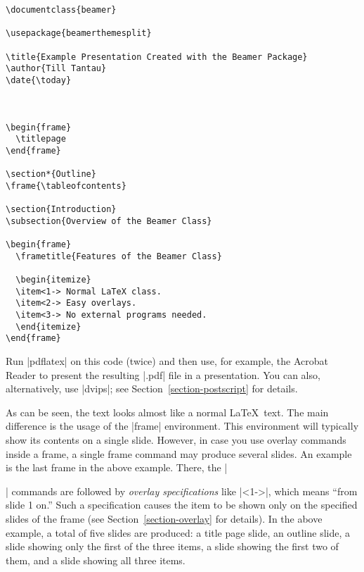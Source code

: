 \begin{verbatim}
\documentclass{beamer}

\usepackage{beamerthemesplit}

\title{Example Presentation Created with the Beamer Package}
\author{Till Tantau}
\date{\today}



\begin{frame}
  \titlepage
\end{frame}

\section*{Outline}
\frame{\tableofcontents}

\section{Introduction}
\subsection{Overview of the Beamer Class}

\begin{frame}
  \frametitle{Features of the Beamer Class}

  \begin{itemize}
  \item<1-> Normal LaTeX class.
  \item<2-> Easy overlays.
  \item<3-> No external programs needed.      
  \end{itemize}
\end{frame}

\end{verbatim}

Run |pdflatex| on this code (twice) and then use, for example, the
Acrobat Reader to present the resulting |.pdf| file in a
presentation. You can also, alternatively, use |dvips|; see
Section~\ref{section-postscript} for details.

As can be seen, the text looks almost like a normal \LaTeX\ text. The
main difference is the usage of the |frame| environment. This
environment will typically show its contents on a single
slide. However, in case you use overlay commands inside a frame, a 
single frame command may produce several slides. An example is the
last frame in the above example. There, the |\item| commands
are followed by \emph{overlay specifications} like |<1->|,
which means ``from slide 1 on.'' Such a specification causes the item
to be shown only on the specified slides of the frame (see
Section~\ref{section-overlay} for details). In the above example, a
total of five slides are produced: a title page slide, an outline
slide, a slide showing only the first of the three items, a slide
showing the first two of them, and a slide showing all three items.
 
